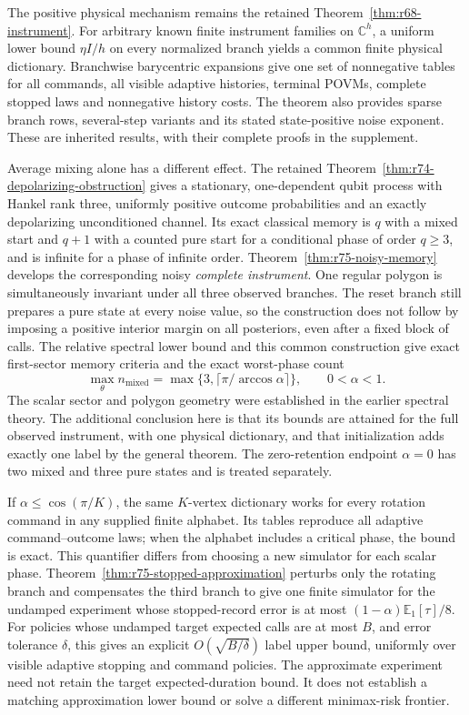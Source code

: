 The positive physical mechanism remains the retained
Theorem~\ref{thm:r68-instrument}. For arbitrary known finite instrument
families on $\mathbb C^h$, a uniform lower bound $\eta I/h$ on every
normalized branch yields a common finite physical dictionary. Branchwise
barycentric expansions give one set of nonnegative tables for all commands,
all visible adaptive histories, terminal POVMs, complete stopped laws and
nonnegative history costs. The theorem also provides sparse branch rows,
several-step variants and its stated state-positive noise exponent.
These are inherited results, with their complete proofs in the supplement.

Average mixing alone has a different effect. The retained
Theorem~\ref{thm:r74-depolarizing-obstruction} gives a stationary,
one-dependent qubit process with Hankel rank three, uniformly positive
outcome probabilities and an exactly depolarizing unconditioned channel.
Its exact classical memory is $q$ with a mixed start and $q+1$ with a counted
pure start for a conditional phase of order $q\ge3$, and is infinite for a
phase of infinite order. Theorem~\ref{thm:r75-noisy-memory} develops the corresponding
noisy \emph{complete instrument}. One regular polygon is simultaneously
invariant under all three observed branches. The reset branch still
prepares a pure state at every noise value, so the construction does not
follow by imposing a positive interior margin on all posteriors, even
after a fixed block of calls. The relative spectral lower
bound and this common construction give exact first-sector memory criteria
and the exact worst-phase count
\[
 \max_\theta n_{\mathrm{mixed}}
   =\max\{3,\lceil\pi/\arccos\alpha\rceil\},\qquad 0<\alpha<1.
\]
The scalar sector and polygon geometry were established in the earlier
spectral theory. The additional conclusion here is that its bounds are
attained for the full observed instrument, with one physical dictionary,
and that initialization adds exactly one label by the general theorem.
The zero-retention endpoint $\alpha=0$ has two mixed and three pure
states and is treated separately.

If $\alpha\le\cos(\pi/K)$, the same $K$-vertex dictionary works for every
rotation command in any supplied finite alphabet. Its tables reproduce all
adaptive command--outcome laws; when the alphabet includes a critical phase,
the bound is exact. This quantifier differs from choosing a new simulator
for each scalar phase. Theorem~\ref{thm:r75-stopped-approximation} perturbs only the rotating branch and compensates
the third branch to give one finite simulator for the undamped experiment
whose stopped-record error is at most $(1-\alpha)\mathbb E_1[\tau]/8$.
For policies whose undamped target expected calls are at most $B$,
and error tolerance $\delta$, this gives an
explicit $O(\sqrt{B/\delta})$ label upper bound, uniformly over visible
adaptive stopping and command policies. The approximate experiment need
not retain the target expected-duration bound. It does not establish a matching
approximation lower bound or solve a different minimax-risk frontier.

